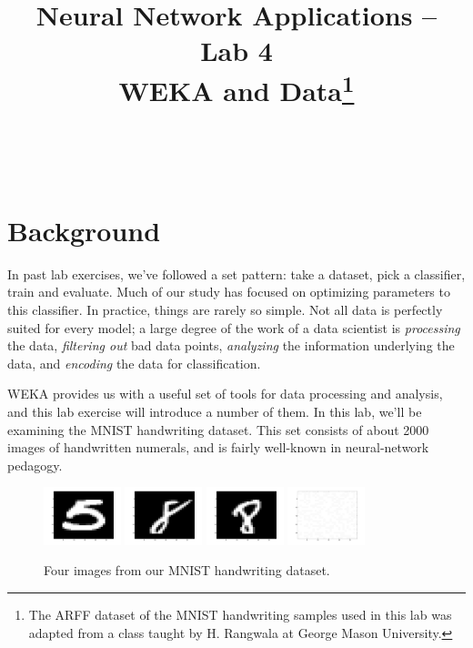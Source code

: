 \documentclass[11pt]{cselabheader}
\title{Neural Network Applications -- Lab 4 \\ WEKA and Data\footnote{The ARFF dataset of the MNIST handwriting samples used in this lab was adapted from a class taught by H. Rangwala at George Mason University.}}
\begin{document}
\maketitle

\horrule{0.5pt}\\\horrule{2pt}

\section{Background}

In past lab exercises, we've followed a set pattern: take a dataset, pick a classifier, train and evaluate. Much of our study has focused on optimizing parameters to this classifier. In practice, things are rarely so simple. Not all data is perfectly suited for every model; a large degree of the work of a data scientist is \emph{processing} the data, \emph{filtering out} bad data points, \emph{analyzing} the information underlying the data, and \emph{encoding} the data for classification.

WEKA provides us with a useful set of tools for data processing and analysis, and this lab exercise will introduce a number of them. In this lab, we'll be examining the MNIST handwriting dataset. This set consists of about 2000 images of handwritten numerals, and is fairly well-known in neural-network pedagogy.

\begin{figure}[h]
  \centering
  \includegraphics[width=0.2\textwidth]{mnist_5.png}
  \includegraphics[width=0.2\textwidth]{mnist_8.png}
  \includegraphics[width=0.2\textwidth]{mnist_8_2.png}
  \includegraphics[width=0.2\textwidth]{mnist_bad.png}
  \caption{Four images from our MNIST handwriting dataset.}
\end{figure}
\end{document}
